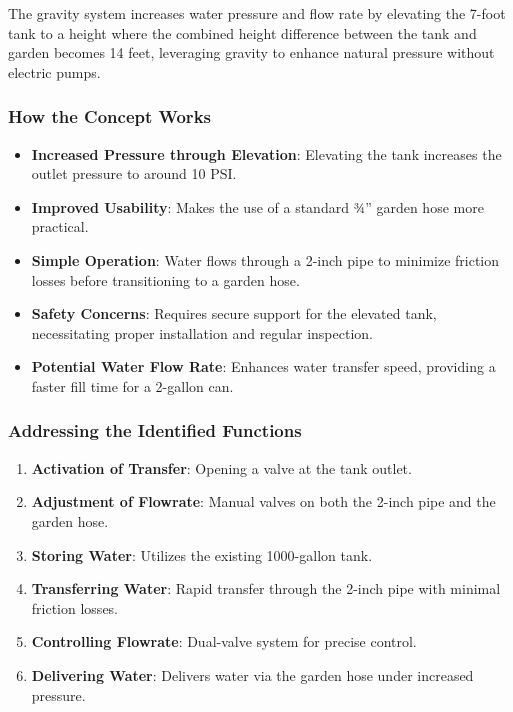 \documentclass{article}
\begin{document}
The gravity system increases water pressure and flow rate by elevating the 7-foot tank to a height where the combined height difference between the tank and garden becomes 14 feet, leveraging gravity to enhance natural pressure without electric pumps.

\subsubsection{How the Concept Works}
\begin{itemize}
    \item \textbf{Increased Pressure through Elevation}: Elevating the tank increases the outlet pressure to around 10 PSI.
    \item \textbf{Improved Usability}: Makes the use of a standard ¾” garden hose more practical.
    \item \textbf{Simple Operation}: Water flows through a 2-inch pipe to minimize friction losses before transitioning to a garden hose.
    \item \textbf{Safety Concerns}: Requires secure support for the elevated tank, necessitating proper installation and regular inspection.
    \item \textbf{Potential Water Flow Rate}: Enhances water transfer speed, providing a faster fill time for a 2-gallon can.
\end{itemize}

\subsubsection{Addressing the Identified Functions}
\begin{enumerate}
    \item \textbf{Activation of Transfer}: Opening a valve at the tank outlet.
    \item \textbf{Adjustment of Flowrate}: Manual valves on both the 2-inch pipe and the garden hose.
    \item \textbf{Storing Water}: Utilizes the existing 1000-gallon tank.
    \item \textbf{Transferring Water}: Rapid transfer through the 2-inch pipe with minimal friction losses.
    \item \textbf{Controlling Flowrate}: Dual-valve system for precise control.
    \item \textbf{Delivering Water}: Delivers water via the garden hose under increased pressure.
\end{enumerate}
\end{document}

